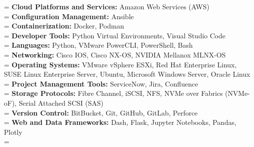 \documentclass[10pt]{article}       %
\begin{document}
\hangindent=\mylength
\textbf{Cloud Platforms and Services:} Amazon Web Services (AWS) \\
\hangindent=\mylength
\textbf{Configuration Management:} Ansible \\
\hangindent=\mylength
\textbf{Containerization:} Docker, Podman \\
\hangindent=\mylength
\textbf{Developer Tools:} Python Virtual Environments, Visual Studio Code \\
\hangindent=\mylength
\textbf{Languages:} Python, VMware PowerCLI, PowerShell, Bash \\
\hangindent=\mylength
\textbf{Networking:} Cisco IOS, Cisco NX-OS, NVIDIA Mellanox MLNX-OS \\
\hangindent=\mylength
\textbf{Operating Systems:} VMware vSphere ESXi, Red Hat Enterprise Linux, SUSE Linux Enterprise Server, Ubuntu, Microsoft Windows Server, Oracle Linux \\
\hangindent=\mylength
\textbf{Project Management Tools:} ServiceNow, Jira, Confluence \\
\hangindent=\mylength
\textbf{Storage Protocols:} Fibre Channel, iSCSI, NFS, NVMe over Fabrics (NVMe-oF), Serial Attached SCSI (SAS) \\
\hangindent=\mylength
\textbf{Version Control:} BitBucket, Git, GitHub, GitLab, Perforce \\
\hangindent=\mylength
\textbf{Web and Data Frameworks:} Dash, Flask, Jupyter Notebooks, Pandas, Plotly \\
\hangindent=\mylength
\end{document}
